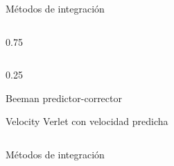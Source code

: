 \begin{frame}{Métodos de integración}
  \begin{cols}
    \begin{column}{0.75\textwidth}
    \end{column}
    \begin{column}{0.25\textwidth}
      \begin{aclaraciones}
        \item Beeman predictor-corrector
        \item Velocity Verlet con velocidad predicha
      \end{aclaraciones}
    \end{column}
  \end{cols}
\end{frame}
\begin{frame}{Métodos de integración}
  \begin{cols}
    \begin{column}{\textwidth}
    \end{column}
  \end{cols}
\end{frame}


